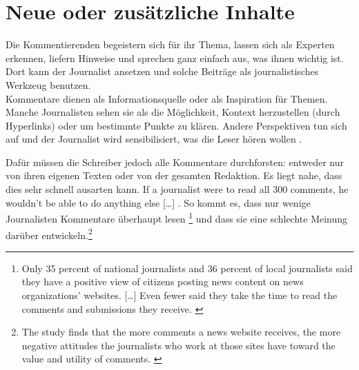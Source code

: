 \section{Neue oder zusätzliche Inhalte}
Die Kommentierenden begeistern sich für ihr Thema, lassen sich als Experten
erkennen, liefern Hinweise und sprechen ganz einfach aus, was ihnen wichtig ist.
Dort kann der Journalist ansetzen und solche Beiträge als \glqq journalistisches
Werkzeug\grqq{} \autocite[S.~133]{robinson} benutzen.\\
Kommentare dienen als Informationsquelle oder als Inspiration für Themen.
Manche Journalisten sehen sie als die Möglichkeit, Kontext herzustellen (durch
Hyperlinks) oder um bestimmte Punkte zu klären. Andere Perspektiven tun sich
auf und der Journalist wird sensibilisiert, was die Leser hören wollen
\autocite[S.~12]{santana:2014}.

Dafür müssen die Schreiber jedoch alle Kommentare durchforsten: entweder nur von
ihren eigenen Texten oder von der gesamten Redaktion. Es liegt nahe, dass dies
sehr schnell ausarten kann. \glqq If a journalist were to read all 300 comments, he
wouldn’t be able to do anything else [\ldots]\grqq\- \autocite[S.~84]{domingo}.  So
kommt es, dass nur wenige Journalisten Kommentare überhaupt lesen
\footnote{\glqq Only 35 percent of national journalists and 36 percent of local
  journalists said they have a positive view of citizens posting news content on
  news organizations' websites.  [\ldots] Even fewer said they take the time to
  read the comments and submissions they receive.\grqq\- \autocite[S.
216]{meyer-carey}}
und dass sie eine schlechte Meinung darüber entwickeln.\footnote{The study finds
  that the more comments a news website receives, the more negative attitudes
  the journalists who work at those sites have toward the value and utility of
  comments. \autocite[S.~214]{meyer-carey}}

